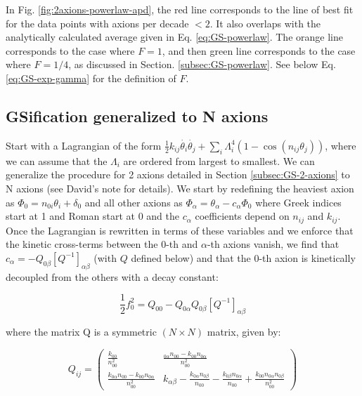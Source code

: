 \documentclass[11pt]{article}
\begin{document}
In Fig. \ref{fig:2axions-powerlaw-apd}, the red line corresponds to the line of best fit for the data points with axions per decade $<2$. It also overlaps with the analytically calculated average given in Eq. \eqref{eq:GS-powerlaw}. The orange line corresponds to the case where $F=1$, and then green line corresponds to the case where $F=1/4$, as discussed in Section. \ref{subsec:GS-powerlaw}. See below Eq. \eqref{eq:GS-exp-gamma} for the definition of $F$. 

\subsection{GSification generalized to N axions}
\label{subsec:general-GS}

Start with a Lagrangian of the form $\frac12k_{ij}\dot{\theta_i}\dot{\theta_j}+\sum_i\Lambda_i^4(1-\cos{(n_{ij}\theta_j)})$, where we can assume that the $\Lambda_i$ are ordered from largest to smallest. We can generalize the procedure for 2 axions  detailed in Section \ref{subsec:GS-2-axions} to N axions (see David's note for details). We start by redefining the heaviest axion as $\Phi_0 = n_{0i}\theta_i + \delta_0 $ and all other axions as $\Phi_\alpha = \theta_\alpha - c_\alpha\Phi_0 $ where Greek indices start at 1 and Roman start at 0 and the $c_\alpha$ coefficients depend on $n_{ij}$ and $k_{ij}$. Once the Lagrangian is rewritten in terms of these variables and we enforce that the kinetic cross-terms between the 0-th and $\alpha$-th axions vanish, we find that $c_\alpha = - Q_{0\beta}[Q^{-1}]_{\alpha\beta}$ (with $Q$ defined below) and that the 0-th axion is kinetically decoupled from the others with a decay constant:

\begin{equation}
    \label{eq:new-decay-constant}
    \frac{1}{2}f_0^2 = Q_{00} - Q_{0\alpha}Q_{0\beta}[Q^{-1}]_{\alpha\beta}
\end{equation}

\noindent where the matrix Q is a symmetric $(N\times N)$ matrix, given by:

\begin{equation}
    \label{eq:Q}
    Q_{ij} = \begin{pmatrix}
        \frac{k_{00}}{n_{00}^2} & \frac{_{0\alpha}n_{00}-k_{00}n_{0\alpha}}{n_{00}^2} \\
         \frac{k_{0\alpha}n_{00}-k_{00}n_{0\alpha}}{n_{00}^2} & k_{\alpha\beta} - \frac{k_{0\alpha}n_{0\beta}}{n_{00}} - \frac{k_{0\beta}n_{0\alpha}}{n_{00}} + \frac{k_{00} n_{0\alpha}n_{0\beta}}{n_{00}^2}
    \end{pmatrix}
\end{equation}
\end{document}
